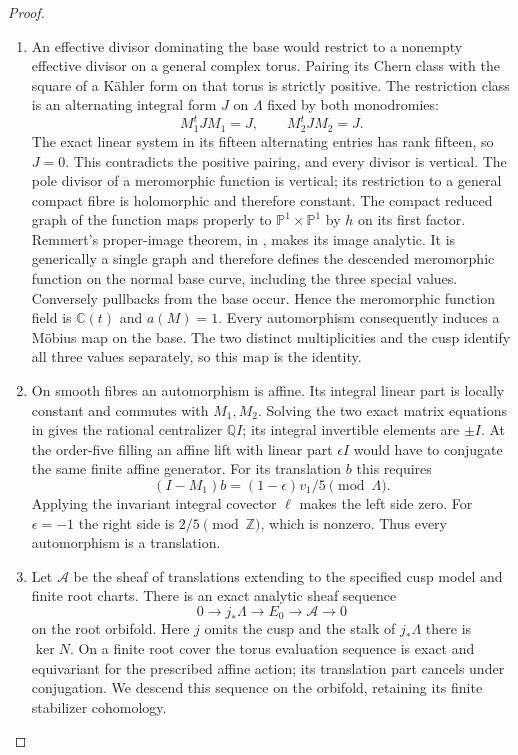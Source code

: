 \begin{proof}
\begin{enumerate}[label=\arabic*.]
\item An effective divisor dominating the base would restrict to
a nonempty effective divisor on a general complex torus.
Pairing its Chern class with the square of a Kähler form
on that torus is strictly positive. The restriction class is an alternating integral form $J$ on $\Lambda$
fixed by both monodromies:
\[
M_1^tJM_1=J,\qquad M_2^tJM_2=J.
\]
The exact linear system in its fifteen alternating entries has rank
fifteen, so $J=0$.  This contradicts the positive pairing, and every
divisor is vertical.
The pole divisor of a meromorphic function is vertical;
its restriction to a general compact fibre is holomorphic
and therefore constant. The compact reduced graph of the function maps properly to
$\mathbb P^1\times\mathbb P^1$ by $h$ on its first factor.
Remmert's proper-image theorem, in
\cite[\S7, Satz~1, p.~60]{Grauert1960D}, makes its image analytic.
It is generically a single graph and therefore defines the descended
meromorphic function on the normal base curve, including the three
special values.
Conversely pullbacks from the base occur. Hence the
meromorphic function field is $\mathbb C(t)$ and $a(M)=1$.
Every automorphism consequently induces a Möbius map on
the base. The two distinct multiplicities and the cusp
identify all three values separately, so this map is the
identity.

\item On smooth fibres an automorphism is affine. Its integral
linear part is locally constant and commutes with $M_1,M_2$.
Solving the two exact matrix equations in
 gives the rational
centralizer $\mathbb Q I$; its integral invertible elements
are $\pm I$. At the order-five filling an affine lift with
linear part $\epsilon I$ would have to conjugate the same
finite affine generator. For its translation $b$ this
requires
\[
(I-M_1)b=(1-\epsilon)v_1/5\pmod\Lambda.
\]
Applying the invariant integral covector $\ell$ makes the
left side zero. For $\epsilon=-1$ the right side is
$2/5\pmod\mathbb Z$, which is nonzero. Thus every
automorphism is a translation.

\item Let $\mathcal A$ be the sheaf of translations extending to
the specified cusp model and finite root charts. There is
an exact analytic sheaf sequence
\[
0\to j_*\Lambda\to E_0\to\mathcal A\to0
\]
on the root orbifold. Here $j$ omits the cusp and the stalk
of $j_*\Lambda$ there is $\ker N$.
On a finite root cover the torus evaluation sequence is exact and
equivariant for the prescribed affine action; its translation part
cancels under conjugation.  We descend this sequence on the orbifold,
retaining its finite stabilizer cohomology.


\end{enumerate}
\end{proof}
